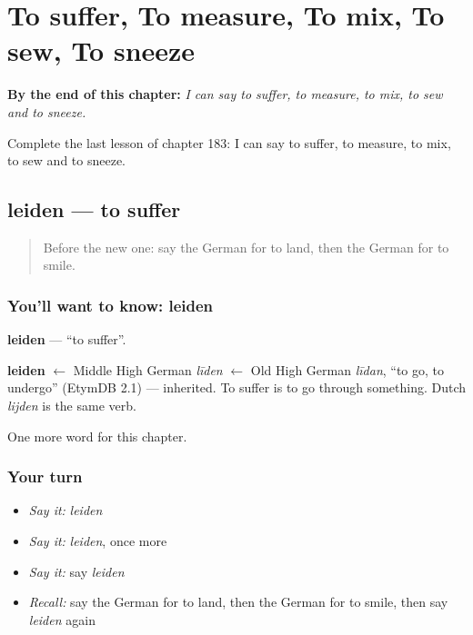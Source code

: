 
\chapter{To suffer, To measure, To mix, To sew, To sneeze}
\label{ch:ge-to-suffer-to-measure-to-mix-to-sew-to-sneeze}

\begin{chapteropening}
\textbf{By the end of this chapter:} \emph{I can say to suffer, to measure, to mix, to sew and to sneeze.}

Complete the last lesson of chapter 183: I can say to suffer, to measure, to mix, to sew and to sneeze.
\end{chapteropening}

\section[leiden]{leiden — to suffer}

\label{lesson:GE-C183-leiden}



\begin{quote}
Before the new one: say the German for to land, then the German for to smile.
\end{quote}

\subsection*{You'll want to know: leiden}
\textbf{leiden} — \textquotedblleft{}to suffer\textquotedblright{}.

\begin{cousinweb}
\textbf{leiden} $\leftarrow$ Middle High German \emph{līden} $\leftarrow$ Old High German \emph{līdan}, \textquotedblleft{}to go, to undergo\textquotedblright{} (EtymDB 2.1) — inherited. To suffer is to go through something. Dutch \emph{lijden} is the same verb.
\end{cousinweb}

\begin{grammarlens}[title={What you've built}]
One more word for this chapter.
\end{grammarlens}

\subsection*{Your turn}
\begin{itemize}
\raggedright
  \item \emph{Say it:} \emph{leiden}
  \item \emph{Say it:} \emph{leiden}, once more
  \item \emph{Say it:} say \emph{leiden}
  \item \emph{Recall:} say the German for to land, then the German for to smile, then say \emph{leiden} again
\end{itemize}

